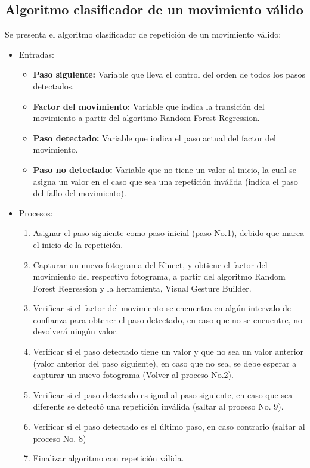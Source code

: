 \subsection{Algoritmo clasificador de un movimiento v\'alido}\label{dis:algoritmoDet}
Se presenta el algoritmo clasificador de repetici\'on de un movimiento v\'alido:
\begin{itemize}
\item Entradas:
\begin{itemize}
\item \textbf{Paso siguiente:} Variable que lleva el control del orden de todos los pasos detectados.
\item \textbf{Factor del movimiento:} Variable que indica la transici\'on del movimiento a partir del algoritmo Random Forest Regression.
\item \textbf{Paso detectado:} Variable que indica el paso actual del factor del movimiento.
\item \textbf{Paso no detectado:} Variable que no tiene un valor al inicio, la cual se asigna un valor en el caso que sea una repetici\'on inv\'alida (indica el paso del fallo del movimiento).
\end{itemize}
\item Procesos:
\begin{enumerate}[1.]
\item Asignar el paso siguiente como paso inicial (paso No.1), debido que marca el inicio de la repetici\'on. %
\item Capturar un nuevo fotograma del Kinect, y obtiene el factor del movimiento del respectivo fotograma, a partir del algoritmo Random Forest Regression y la herramienta, Visual Gesture Builder. %
\item Verificar si el factor del movimiento se encuentra en alg\'un intervalo de confianza para obtener el paso detectado, en caso que no se encuentre, no devolver\'a ning\'un valor.  %
\item Verificar si el paso detectado tiene un valor y que no sea un valor anterior (valor anterior del paso siguiente), en caso que no sea, se debe esperar a capturar un nuevo fotograma (Volver al proceso No.2). %
\item Verificar si el paso detectado es igual al paso siguiente, en caso que sea diferente se detect\'o una repetici\'on inv\'alida (saltar al proceso No. 9). %
\item Verificar si el paso detectado es el \'ultimo paso, en caso contrario (saltar al proceso No. 8) %
\item Finalizar algoritmo con repetici\'on v\'alida. %

\end{enumerate}
\end{itemize}
